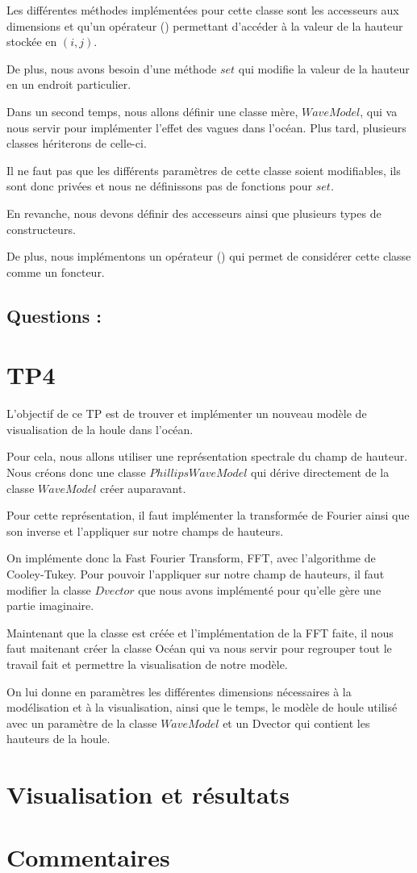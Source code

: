 \documentclass{article}
\begin{document}
Les différentes méthodes implémentées pour cette classe sont les accesseurs aux dimensions et qu'un opérateur () permettant d'accéder à la valeur de la hauteur stockée en $(i,j)$.

De plus, nous avons besoin d'une méthode $set$ qui modifie la valeur de la hauteur en un endroit particulier.

Dans un second temps,  nous allons définir une classe mère, $WaveModel$, qui va nous servir pour implémenter l'effet des vagues dans l'océan. Plus tard, plusieurs classes hériterons de celle-ci.

Il ne faut pas que les différents paramètres de cette classe soient modifiables, ils sont donc privées et nous ne définissons pas de fonctions pour $set$.

En revanche, nous devons définir des accesseurs ainsi que plusieurs types de constructeurs.

De plus, nous implémentons un opérateur () qui permet de considérer cette classe comme un foncteur.

\subsection{Questions :}

\section{TP4}

L'objectif de ce TP est de trouver et implémenter un nouveau modèle de visualisation de la houle dans l'océan.

Pour cela, nous allons utiliser une représentation spectrale du champ de hauteur. Nous créons donc une classe $PhillipsWaveModel$ qui dérive directement de la classe $WaveModel$ créer auparavant.

Pour cette représentation, il faut implémenter la transformée de Fourier ainsi que son inverse et l'appliquer sur notre champs de hauteurs.

On implémente donc la Fast Fourier Transform, FFT, avec l'algorithme de Cooley-Tukey. Pour pouvoir l'appliquer sur notre champ de hauteurs, il faut modifier la classe $Dvector$ que nous avons implémenté pour qu'elle gère une partie imaginaire.


Maintenant que la classe est créée et l'implémentation de la FFT faite, il nous faut maitenant créer la classe Océan qui va nous servir pour regrouper tout le travail fait et permettre la visualisation de notre modèle.

On lui donne en paramètres les différentes dimensions nécessaires à la modélisation et à la visualisation, ainsi que le temps, le modèle de houle utilisé avec un paramètre de la classe $WaveModel$ et un Dvector qui contient les hauteurs de la houle.



\section{Visualisation et résultats}

\section{Commentaires}
\end{document}
